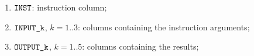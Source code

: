\begin{enumerate}
\item
	\godGiven{}
	$\texttt{INST}{}$:
	instruction column;
    \item
	\godGiven{}
	$\texttt{INPUT\_k}$, $k=1..3$:
	columns containing the instruction arguments;
    \item
	\markAsJustifiedHere{}
	$\texttt{OUTPUT\_k}$, $k=1..5$:
	columns containing the results;
\end{enumerate}
